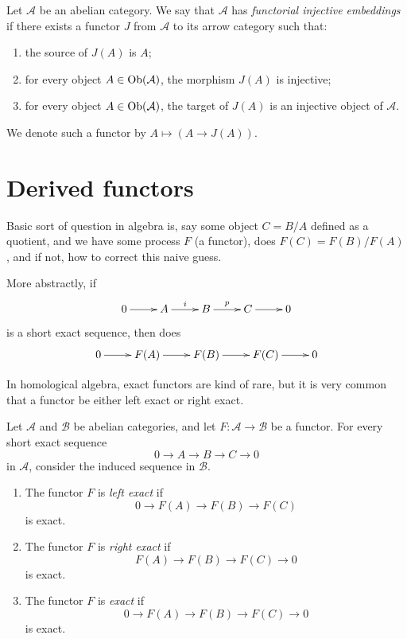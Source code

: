 \begin{definition}
\label{definition-functorial-injectives}
Let $\mathcal{A}$ be an abelian category.
We say that $\mathcal{A}$ has {\it
functorial injective embeddings} if there
exists a functor $J$ from $\mathcal{A}$ to
its arrow category such that:
\begin{enumerate}
\item the source of $J(A)$ is $A$;
\item for every object
$A \in \mathop{\mathrm{Ob}}\nolimits(\mathcal{A})$, the morphism
$J(A)$ is injective;
\item for every object
$A \in \mathop{\mathrm{Ob}}\nolimits(\mathcal{A})$, the target of
$J(A)$ is an injective object of
$\mathcal{A}$.
\end{enumerate}
We denote such a functor by
$A \mapsto (A \to J(A))$.
\end{definition}








\section{Derived functors}
\label{section-derived-functos}

\noindent
Basic sort of question in algebra is,
say some object $C=B/A$ defined
as a quotient,
and we have some process $F$
(a functor), does $F(C)=F(B)/F(A)$,
and if not, how to correct this naive guess.

More abstractly, if
$$
\xymatrix{
0\ar[r]
&A\ar[r]^i
&B\ar[r]^p
&C\ar[r]
&0
}
$$
is a short exact sequence, then does
$$
\xymatrix{
0\ar[r]
&F(A)\ar[r]
&F(B)\ar[r]
&F(C)\ar[r]
&0
}
$$

\begin{remark}
\label{remark-exact-functors}
In homological algebra,
exact functors are kind of rare,
but it is very common that a functor be
either left exact or right exact.
\end{remark}

\begin{definition}
\label{definition-exact-functors}
Let $\mathcal{A}$ and $\mathcal{B}$ be
abelian categories, and let
$F : \mathcal{A} \to \mathcal{B}$ be a
functor. For every short exact sequence
$$
0 \to A \to B \to C \to 0
$$
in $\mathcal{A}$, consider the induced
sequence in $\mathcal{B}$.
\begin{enumerate}
\item The functor $F$ is {\it left exact}
if
$$
0 \to F(A) \to F(B) \to F(C)
$$
is exact.
\item The functor $F$ is {\it right exact}
if
$$
F(A) \to F(B) \to F(C) \to 0
$$
is exact.
\item The functor $F$ is {\it exact} if
$$
0 \to F(A) \to F(B) \to F(C) \to 0
$$
is exact.
\end{enumerate}
\end{definition}

